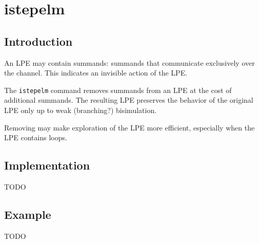 \chapter{istepelm}

\section{Introduction}

An LPE may contain \istep{} summands: summands that communicate exclusively over the \istep{} channel.
This indicates an invisible action of the LPE.

The \texttt{istepelm} command removes \istep{} summands from an LPE at the cost of additional summands.
The resulting LPE preserves the behavior of the original LPE only up to weak (branching?) bisimulation.

Removing \istep{} may make exploration of the LPE more efficient, especially when the LPE contains \istep{} loops.

\section{Implementation}

TODO

\section{Example}

TODO

